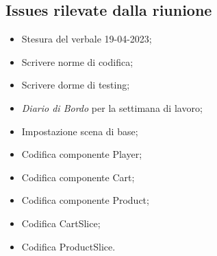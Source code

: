 \subsection{Issues rilevate dalla riunione}
\begin{itemize}
    \item Stesura del verbale 19-04-2023;
    \item Scrivere norme di codifica;    
    \item Scrivere dorme di testing;
    \item \textit{Diario di Bordo} per la settimana di lavoro;
    \item Impostazione scena di base;
    \item Codifica componente Player;
    \item Codifica componente Cart;
    \item Codifica componente Product;
    \item Codifica CartSlice;
    \item Codifica ProductSlice.
\end{itemize}